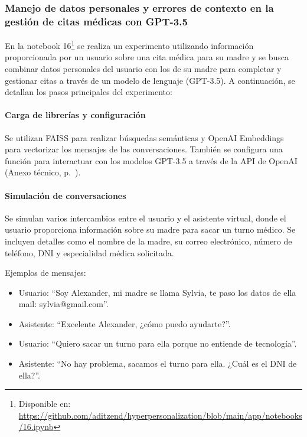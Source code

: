 \subsubsection{Manejo de datos personales y errores de contexto en la gestión de citas médicas con GPT-3.5}

En la notebook 16\footnote{Disponible en: \url{https://github.com/aditzend/hyperpersonalization/blob/main/app/notebooks/16.ipynb}} se realiza un experimento utilizando información proporcionada por un usuario sobre una cita médica para su madre y se busca combinar datos personales del usuario con los de su madre para completar y gestionar citas a través de un modelo de lenguaje (GPT-3.5). A continuación, se detallan los pasos principales del experimento:

\paragraph{Carga de librerías y configuración}

Se utilizan FAISS para realizar búsquedas semánticas y OpenAI Embeddings para vectorizar los mensajes de las conversaciones. También se configura una función para interactuar con los modelos GPT-3.5 a través de la API de OpenAI (Anexo técnico, p.~\pageref{anexo:code-4-1-16-1}).

\paragraph{Simulación de conversaciones}

Se simulan varios intercambios entre el usuario y el asistente virtual, donde el usuario proporciona información sobre su madre para sacar un turno médico. Se incluyen detalles como el nombre de la madre, su correo electrónico, número de teléfono, DNI y especialidad médica solicitada.

Ejemplos de mensajes:

\begin{itemize}
\item Usuario: ``Soy Alexander, mi madre se llama Sylvia, te paso los datos de ella mail: sylvia@gmail.com''.
\item Asistente: ``Excelente Alexander, ¿cómo puedo ayudarte?''.
\item Usuario: ``Quiero sacar un turno para ella porque no entiende de tecnología''.
\item Asistente: ``No hay problema, sacamos el turno para ella. ¿Cuál es el DNI de ella?''.
\end{itemize}

